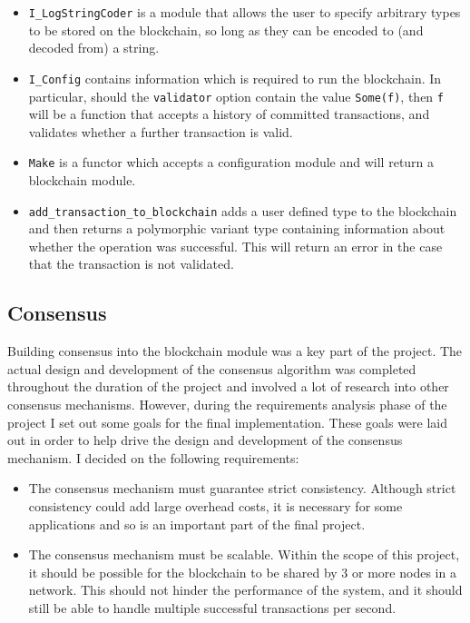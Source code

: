 \documentclass[12pt,a4paper,twoside,openright]{report}
\begin{document}
	\begin{itemize}
		\item \texttt{I\_LogStringCoder} is a module that allows the user to specify arbitrary types to be stored on the blockchain, so long as they can be encoded to (and decoded from) a string.
		\item \texttt{I\_Config} contains information which is required to run the blockchain.
			In particular, should the \texttt{validator} option contain the value \texttt{Some(f)}, then \texttt{f} will be a function that accepts a history of committed transactions, and validates whether a further transaction is valid. 
		\item \texttt{Make} is a functor which accepts a configuration module and will return a blockchain module.
		\item \texttt{add\_transaction\_to\_blockchain} adds a user defined type to the blockchain and then returns a polymorphic variant type containing information about whether the operation was successful. 
			This will return an error in the case that the transaction is not validated.
	\end{itemize} 

	\subsection{Consensus}
	Building consensus into the blockchain module was a key part of the project. 
	The actual design and development of the consensus algorithm was completed throughout the duration of the project and involved a lot of research into other consensus mechanisms.
	However, during the requirements analysis phase of the project I set out some goals for the final implementation.
	These goals were laid out in order to help drive the design and development of the consensus mechanism. 
	I decided on the following requirements:
	\begin{itemize}
		\item The consensus mechanism must guarantee strict consistency. Although strict consistency could add large overhead costs, it is necessary for some applications and so is an important part of the final project.
		\item The consensus mechanism must be scalable. Within the scope of this project, it should be possible for the blockchain to be shared by 3 or more nodes in a network. This should not hinder the performance of the system, and it should still be able to handle multiple successful transactions per second.
	\end{itemize}
\end{document}
